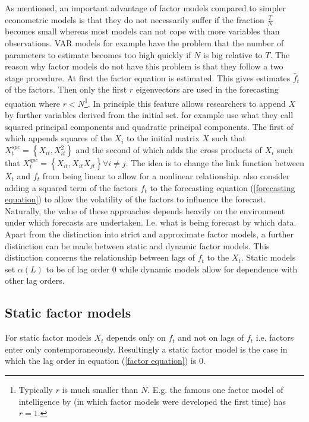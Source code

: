\documentclass[12pt]{article}
\begin{document}
As mentioned, an important advantage of factor models compared to simpler econometric models is that they do not necessarily suffer if the fraction $\frac{T}{N}$ becomes small whereas most models can not cope with more variables than observations. VAR models for example have the problem that the number of parameters to estimate becomes too high quickly if $N$ is big relative to $T$. 
The reason why factor models do not have this problem is that they follow a two stage procedure. At first the factor equation is estimated. This gives estimates $\hat f_t$ of the factors. Then only the first $r$ eigenvectors are used in the forecasting equation where $r<N$\footnote{Typically $r$ is much smaller than $N$. E.g. the famous one factor model of intelligence by \citet{spearman1904general} (in which factor models were developed the first time) has $r=1$.}. In principle this feature allows researchers to append $X$ by further variables derived from the initial set. \citet{bai2008forecasting} for example use what they call squared principal components and quadratic principal components. The first of which appends squares of the $X_i$ to the initial matrix $X$ such that $X_{t}^{spc}=\left\{X_{it}, X_{it}^2\right\}$ and the second of which adds the cross products of $X_i$ such that $X_t^{qpc} = \left\{ X_{it}, X_{it} X_{jt}\right\} \forall i \not= j$. The idea is to change the link function between $X_t$ and $f_t$ from being linear to allow for a nonlinear relationship. \citet{bai2008forecasting} also consider adding a squared term of the factors $f_t$ to the forecasting equation (\ref{forecasting equation}) to allow the volatility of the factors to influence the forecast. Naturally, the value of these approaches depends heavily on the environment under which forecasts are undertaken. I.e. what is being forecast by which data. \\

Apart from the distinction into strict and approximate factor models, a further distinction can be made between static and dynamic factor models. This distinction concerns the relationship between lags of $f_t$ to the $X_t$. Static models set $\alpha(L)$ to be of lag order $0$ while dynamic models allow for dependence with other lag orders.


\subsection{Static factor models}
For static factor models $X_t$ depends only on $f_t$ and not on lags of $f_t$ i.e. factors enter only contemporaneously. Resultingly a static factor model is the case in which the lag order in equation (\ref{factor equation}) is 0.
\end{document}
